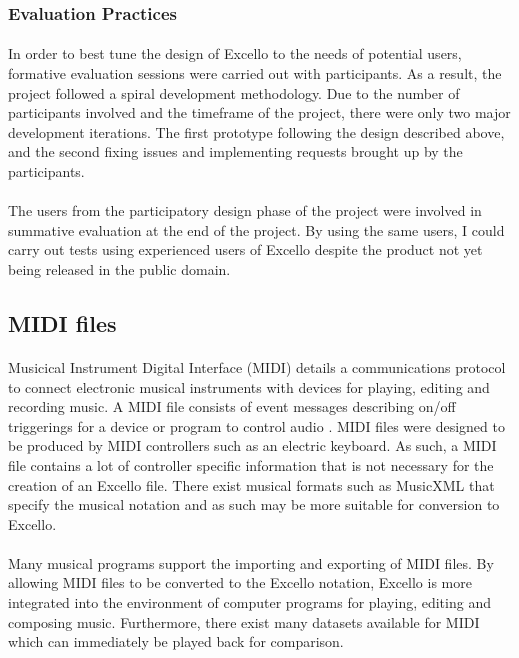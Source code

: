 \subsubsection{Evaluation Practices}

\paragraph{} In order to best tune the design of Excello to the needs of potential users, formative evaluation sessions were carried out with participants. As a result, the project followed a spiral development methodology. Due to the number of participants involved and the timeframe of the project, there were only two major development iterations. The first prototype following the design described above, and the second fixing issues and implementing requests brought up by the participants.

\paragraph{} The users from the participatory design phase of the project were involved in summative evaluation at the end of the project. By using the same users, I could carry out tests using experienced users of Excello despite the product not yet being released in the public domain.

\subsection{MIDI files}

\paragraph{} Musicical Instrument Digital Interface (MIDI) details a communications protocol to connect electronic musical instruments with devices for playing, editing and recording music. A MIDI file consists of event messages describing on/off triggerings for a device or program to control audio \cite{huber:midimanual}. MIDI files were designed to be produced by MIDI controllers such as an electric keyboard. As such, a MIDI file contains a lot of controller specific information that is not necessary for the creation of an Excello file. There exist musical formats such as MusicXML that specify the musical notation and as such may be more suitable for conversion to Excello.

\paragraph{} Many musical programs support the importing and exporting of MIDI files. By allowing MIDI files to be converted to the Excello notation, Excello is more integrated into the environment of computer programs for playing, editing and composing music. Furthermore, there exist many datasets available for MIDI \cite{huang:deep} which can immediately be played back for comparison.
